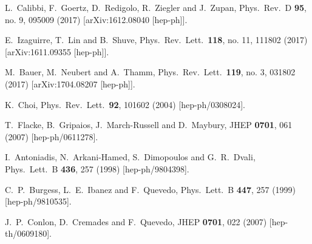 \documentclass[preprint,prd,aps,tighten,nofootinbib,amssymb]{revtex4}
\begin{document}
\begin{thebibliography}{99}
  L.~Calibbi, F.~Goertz, D.~Redigolo, R.~Ziegler and J.~Zupan,
  Phys.\ Rev.\ D {\bf 95}, no. 9, 095009 (2017)
  [arXiv:1612.08040 [hep-ph]].
  
  E.~Izaguirre, T.~Lin and B.~Shuve,
  Phys.\ Rev.\ Lett.\  {\bf 118}, no. 11, 111802 (2017)
  [arXiv:1611.09355 [hep-ph]].
  
  M.~Bauer, M.~Neubert and A.~Thamm,
  Phys.\ Rev.\ Lett.\  {\bf 119}, no. 3, 031802 (2017)
  [arXiv:1704.08207 [hep-ph]].
  
  K.~Choi,
  Phys.\ Rev.\ Lett.\  {\bf 92}, 101602 (2004)
  [hep-ph/0308024].
  
  T.~Flacke, B.~Gripaios, J.~March-Russell and D.~Maybury,
  JHEP {\bf 0701}, 061 (2007)
  [hep-ph/0611278].
  
  I.~Antoniadis, N.~Arkani-Hamed, S.~Dimopoulos and G.~R.~Dvali,
  Phys.\ Lett.\ B {\bf 436}, 257 (1998)
  [hep-ph/9804398].
  
  C.~P.~Burgess, L.~E.~Ibanez and F.~Quevedo,
  Phys.\ Lett.\ B {\bf 447}, 257 (1999)
  [hep-ph/9810535].
  
  
  J.~P.~Conlon, D.~Cremades and F.~Quevedo,
  JHEP {\bf 0701}, 022 (2007)
  [hep-th/0609180].
  

\end{thebibliography}
\end{document}
